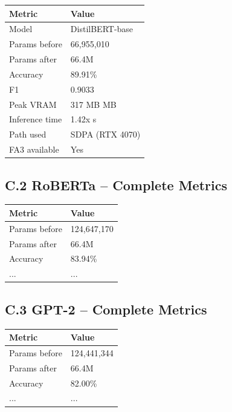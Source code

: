 \begin{table}[H]
\centering
\small
\begin{tabular}{ll}
\toprule
\textbf{Metric} & \textbf{Value} \\
\midrule
Model & DistilBERT-base \\
Params before & 66,955,010 \\
Params after & 66.4M \\
Accuracy & 89.91\% \\
F1 & 0.9033 \\
Peak VRAM & 317 MB MB \\
Inference time & 1.42x s \\
Path used & SDPA (RTX 4070) \\
FA3 available & Yes \\
\bottomrule
\end{tabular}
\end{table}

\subsection{C.2 RoBERTa -- Complete Metrics}

\begin{table}[H]
\centering
\small
\begin{tabular}{ll}
\toprule
\textbf{Metric} & \textbf{Value} \\
\midrule
Params before & 124,647,170 \\
Params after & 66.4M \\
Accuracy & 83.94\% \\
... & ... \\
\bottomrule
\end{tabular}
\end{table}

\subsection{C.3 GPT-2 -- Complete Metrics}

\begin{table}[H]
\centering
\small
\begin{tabular}{ll}
\toprule
\textbf{Metric} & \textbf{Value} \\
\midrule
Params before & 124,441,344 \\
Params after & 66.4M \\
Accuracy & 82.00\% \\
... & ... \\
\bottomrule
\end{tabular}
\end{table}

